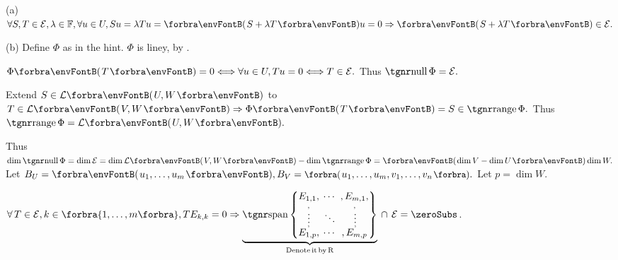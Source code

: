 \par\quad
(a) \,$\forall S,T\in\mathcal{E},\lambda\in\Fbb,\forall u\in U,Su=\lambda Tu=\Par{S+\lambda T}u=0\Rightarrow\Par{S+\lambda T}\in\mathcal{E}.$\par\quad
(b) Define $\Phi$ as in the hint. $\Phi$ is liney, by .\vspace{2pt}\par\quad\Hb
$\Phi\Par{T}=0\Longleftrightarrow\forall u\in U,Tu=0\Longleftrightarrow T\in\mathcal{E}.$ Thus $\null\Phi=\mathcal{E}.$\par\quad\Hb
Extend $S\in\Lm{U,W}$ to $T\in\Lm{V,W}\Rightarrow\Phi\Par{T}=S\in\range\Phi.$ Thus $\range\Phi=\Lm{U,W}.$\vspace{2pt}\par\quad\Hb
Thus $\dim\null\Phi=\dim\mathcal{E}=\dim\Lm{V,W}-\dim\range\Phi=\Par{\!\dim V-\dim U}\dim W.$\PfEnd\vspace{6pt}\quad\Hb
\Or Let $B_U=\Par{u_1,\dots,u_m},B_V=\BigPar{u_1,\dots,u_m,v_1,\dots,v_n}.$ Let $p=\dim W$. \par\vspace{2pt}\quad\Hb
$\forall \,T\in\mathcal{E},k\in\Bra{1,\dots,m},TE_{k,k}=0\Rightarrow{\normalsize\underbrace{\Spn\!\begin{Bmatrix} \underset{\;,}{E_{1,1}}, &\hspace{-6pt} \cdots &\hspace{-6pt} ,\underset{\!,}{E_{m,1}},\\[-2pt] \vdots &\hspace{-6pt} \ddots &\hspace{-6pt} \,\vdots\\[-2pt] \overset{\;,}{E_{1,p}}, &\hspace{-6pt} \cdots &\hspace{-6pt} ,\overset{\!\!,}{E_{m,p}}\end{Bmatrix}}_{\text{Denote\,it\,by\,R}}}\,\cap\,\mathcal{E}=\zeroSubs$.\vspace{-32pt}\par\Hb
